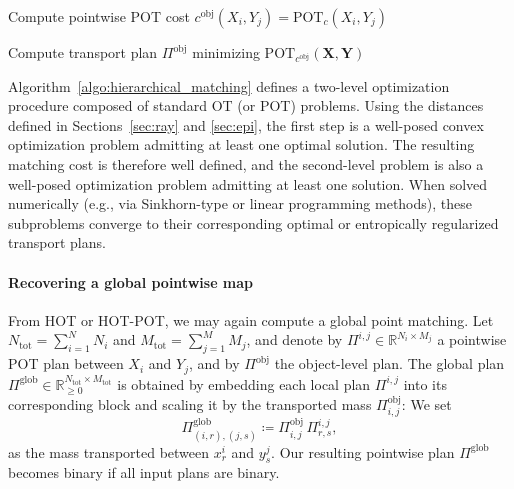 \documentclass[10pt, twocolumn]{article}
\theoremstyle{definition}
\newcommand{\R}{{\ensuremath{\mathbb{R}}}}
\begin{document}
\begin{algorithm}[!ht]
\caption{Hierarchical Object Matching} \label{algo:hierarchical_matching}

    {Compute pointwise POT cost
    \hspace{1em} 
    $c^{\mathrm{obj}}(X_i,Y_j) = \mathrm{POT}_c (X_i, Y_j)$}

Compute transport plan $\Pi^{\mathrm{obj}}$ minimizing
\hspace{1em} $\mathrm{POT}_{c^{\mathrm{obj}}}(\boldsymbol{X}, \boldsymbol{Y})$

\end{algorithm}
{\color{black} 
Algorithm~\ref{algo:hierarchical_matching} defines a two-level optimization procedure composed of standard OT (or POT) problems. Using the distances defined in Sections~\ref{sec:ray} and \ref{sec:epi}, the first step is a well-posed convex optimization problem admitting at least one optimal solution. The resulting matching cost is therefore well defined, and the second-level problem is also a well-posed optimization problem admitting at least one solution. When solved numerically (e.g., via Sinkhorn-type or linear programming methods), these subproblems converge to their corresponding optimal or entropically regularized transport plans.}

\paragraph*{Recovering a global pointwise map}
From HOT or HOT-POT, we may again compute a global point matching. Let 
$N_{\mathrm{tot}}=\sum_{i=1}^N N_i$ and $M_{\mathrm{tot}}=\sum_{j=1}^M M_j$,
and denote by ${ \Pi^{i,j} \in \R^{N_i \times M_j}}$ a pointwise POT plan between 
$X_i$ and $Y_j$, and by $\Pi^{\mathrm{obj}}$ the object-level plan.  
The global plan 
$\Pi^{\mathrm{glob}}\in\mathbb{R}_{\ge0}^{N_{\mathrm{tot}}\times M_{\mathrm{tot}}}$ 
is obtained by embedding each local plan ${ \Pi^{i,j}}$ into its
corresponding block and scaling it by the transported mass $\Pi^{\mathrm{obj}}_{i,j}$:
We set
\begin{equation}\label{eq:global_plan}
\Pi^{\mathrm{glob}}_{(i,r),(j,s)}
\coloneqq
\Pi^{\mathrm{obj}}_{i,j}\,
  \Pi^{i,j}_{r, s},
\end{equation}
as the mass transported between $x_r^i$ and $y_s^j$.
Our resulting pointwise plan $\Pi^{\mathrm{glob}}$ becomes binary if all input plans are binary.
\end{document}
